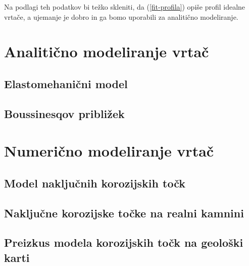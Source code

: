 \documentclass[a4paper, oneside, 12pt]{book}
\begin{document}
Na podlagi teh podatkov bi težko skleniti, da (\ref{fit-profila}) opiše profil idealne vrtače, a ujemanje je dobro in ga bomo uporabili za analitično modeliranje. 


\chapter{Analitično modeliranje vrtač}
\label{ch2}

\section{Elastomehanični model}
\section{Boussinesqov približek}


\chapter{Numerično modeliranje vrtač} 
\label{ch3}

\section{Model naključnih korozijskih točk}
\section{Naključne korozijske točke na realni kamnini}
\section{Preizkus modela korozijskih točk na geološki karti}

\nocite{*}
\newpage
{}

\end{document}
